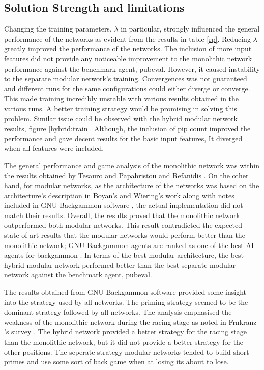 \documentclass[12pt,a4paper]{article}
\begin{document}
\subsection{Solution Strength and limitations}
Changing the training parameters, $\lambda$ in particular, strongly influenced the general performance of the networks as evident from the results in table \ref{rp}. Reducing $\lambda$ greatly improved the performance of the networks. The inclusion of more input features did not provide any noticeable improvement to the monolithic network performance against the benchmark agent, pubeval. However, it caused instability to the separate modular network's training. Convergences was not guaranteed and different runs for the same configurations could either diverge or converge. This made training incredibly unstable with various results obtained in the various runs. A better training strategy would be promising in solving this problem. Similar issue could be observed with the hybrid modular network results, figure \ref{hybrid:train}. Although, the inclusion of pip count improved the performance and gave decent results for the basic input features, It diverged when all features were included. 

The general performance and game analysis of the monolithic network was within the results obtained by Tesauro \citeyear{DBLP:journals/ai/Tesauro02} and Papahristou and Refanidis \citeyear{DBLP:conf/ifip12/PapahristouR12}. On the other hand, for modular networks, as the architecture of the networks was based on the architecture's description in Boyan's \citeyear{boyan} and Wiering's \citeyear{DBLP:journals/jilsa/Wiering10} work along with notes included in GNU-Backgammon software \cite{gnubg}, the actual implementation did not match their results. Overall, the results proved that the monolithic network outperformed both modular networks. This result contradicted the expected state-of-art results that the modular networks would perform better than the monolithic network; GNU-Backgammon agents are ranked as one of the best AI agents for backgammon \cite{exg}. In terms of the best modular architecture, the best hybrid modular network performed better than the best separate modular network against the benchmark agent, pubeval. 

The results obtained from GNU-Backgammon software provided some insight into the strategy used by all networks. The priming strategy seemed to be the dominant strategy followed by all networks. The analysis emphasised the weakness of the monolithic network during the racing stage as noted in Frnkranz 's survey \citeyear{survey}. The hybrid network provided a better strategy for the racing stage than the monolithic network, but it did not provide a better strategy for the other positions. The seperate strategy modular networks tended to build short primes and use some sort of back game when at losing its about to lose.
\end{document}
